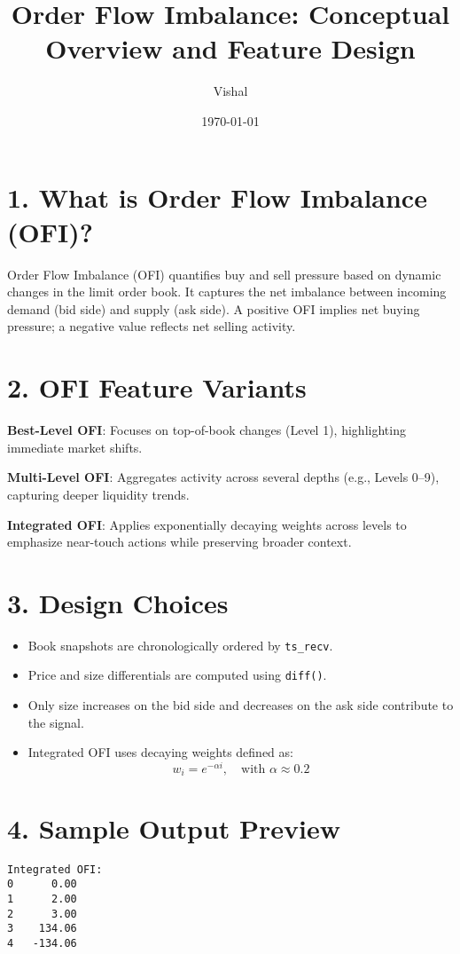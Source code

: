 \documentclass{article}
\title{Order Flow Imbalance: Conceptual Overview and Feature Design}
\author{Vishal}
\date{\today}
\begin{document}
\maketitle

\section*{1. What is Order Flow Imbalance (OFI)?}
Order Flow Imbalance (OFI) quantifies buy and sell pressure based on dynamic changes in the limit order book. It captures the net imbalance between incoming demand (bid side) and supply (ask side). A positive OFI implies net buying pressure; a negative value reflects net selling activity.

\section*{2. OFI Feature Variants}
\textbf{Best-Level OFI}: Focuses on top-of-book changes (Level 1), highlighting immediate market shifts.

\textbf{Multi-Level OFI}: Aggregates activity across several depths (e.g., Levels 0–9), capturing deeper liquidity trends.

\textbf{Integrated OFI}: Applies exponentially decaying weights across levels to emphasize near-touch actions while preserving broader context.

\section*{3. Design Choices}
\begin{itemize}
  \item Book snapshots are chronologically ordered by \texttt{ts\_recv}.
  \item Price and size differentials are computed using \texttt{diff()}.
  \item Only size increases on the bid side and decreases on the ask side contribute to the signal.
  \item Integrated OFI uses decaying weights defined as:
    \[
      w_i = e^{-\alpha i}, \quad \text{with } \alpha \approx 0.2
    \]
\end{itemize}

\section*{4. Sample Output Preview}
\begin{verbatim}
Integrated OFI:
0      0.00
1      2.00
2      3.00
3    134.06
4   -134.06
\end{verbatim}
\end{document}
